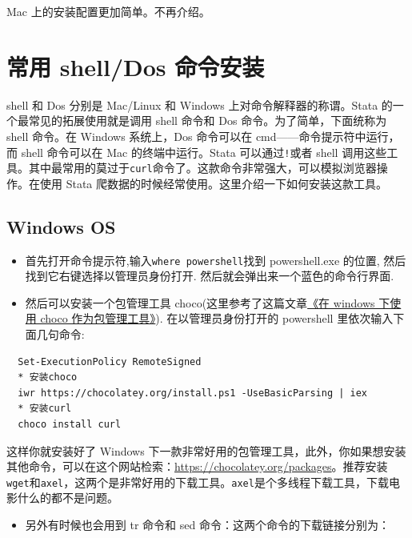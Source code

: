 \documentclass[cn,fancy,blue,11pt]{elegantbook}
\begin{document}
Mac 上的安装配置更加简单。不再介绍。

\hypertarget{shelldos-}{%
\section{常用 shell/Dos 命令安装}\label{shelldos-}}

shell 和 Dos 分别是 Mac/Linux 和 Windows 上对命令解释器的称谓。Stata 的一个最常见的拓展使用就是调用 shell 命令和 Dos 命令。为了简单，下面统称为 shell 命令。在 Windows 系统上，Dos 命令可以在 cmd------命令提示符中运行，而 shell 命令可以在 Mac 的终端中运行。Stata 可以通过\lstinline{!}或者 shell 调用这些工具。其中最常用的莫过于\lstinline{curl}命令了。这款命令非常强大，可以模拟浏览器操作。在使用 Stata 爬数据的时候经常使用。这里介绍一下如何安装这款工具。

\hypertarget{windows-os-3}{%
\subsection{Windows OS}\label{windows-os-3}}

\begin{itemize}
\item
  首先打开命令提示符,输入\lstinline{where powershell}找到 powershell.exe 的位置, 然后找到它右键选择以管理员身份打开. 然后就会弹出来一个蓝色的命令行界面.
\item
  然后可以安装一个包管理工具 choco(这里参考了这篇文章\href{https://www.jianshu.com/p/be19a2bebc48}{《在 windows 下使用 choco 作为包管理工具》}). 在以管理员身份打开的 powershell 里依次输入下面几句命令:
\end{itemize}

\begin{lstlisting}
  Set-ExecutionPolicy RemoteSigned
  * 安装choco
  iwr https://chocolatey.org/install.ps1 -UseBasicParsing | iex
  * 安装curl
  choco install curl
\end{lstlisting}

这样你就安装好了 Windows 下一款非常好用的包管理工具，此外，你如果想安装其他命令，可以在这个网站检索：\url{https://chocolatey.org/packages}。推荐安装\lstinline{wget}和\lstinline{axel}，这两个是非常好用的下载工具。\lstinline{axel}是个多线程下载工具，下载电影什么的都不是问题。

\begin{itemize}
\item
  另外有时候也会用到 tr 命令和 sed 命令：这两个命令的下载链接分别为：
\end{itemize}
\end{document}
